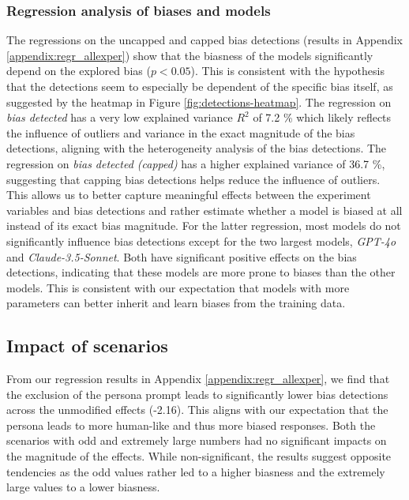 \subsubsection{Regression analysis of biases and models}
\par The regressions on the uncapped and capped bias detections (results in Appendix \ref{appendix:regr_allexper}) show that the biasness of the models significantly depend on the explored bias ($p < 0.05$). This is consistent with the hypothesis that the detections seem to especially be dependent of the specific bias itself, as suggested by the heatmap in Figure \ref{fig:detections-heatmap}. The regression on \textit{bias detected} has a very low explained variance $R^2$  of 7.2 \% which likely reflects the influence of outliers and variance in the exact magnitude of the bias detections, aligning with the heterogeneity analysis of the bias detections. The regression on \textit{bias detected (capped)} has a higher explained variance of 36.7 \%, suggesting that capping bias detections helps reduce the influence of outliers. This allows us to better capture meaningful effects between the experiment variables and bias detections and rather estimate whether a model is biased at all instead of its exact bias magnitude. For the latter regression, most models do not significantly influence bias detections except for the two largest models, \textit{GPT-4o} and \textit{Claude-3.5-Sonnet}. Both have significant positive effects on the bias detections, indicating that these models are more prone to biases than the other models. This is consistent with our expectation that models with more parameters can better inherit and learn biases from the training data.


\subsection{Impact of scenarios}
\label{results:scenarioimpact}
\par From our regression results in Appendix \ref{appendix:regr_allexper}, we find that the exclusion of the persona prompt leads to significantly lower bias detections across the unmodified effects (-2.16). This aligns with our expectation that the persona leads to more human-like and thus more biased responses. Both the scenarios with odd and extremely large numbers had no significant impacts on the magnitude of the effects. While non-significant, the results suggest opposite tendencies as the odd values rather led to a higher biasness and the extremely large values to a lower biasness.

